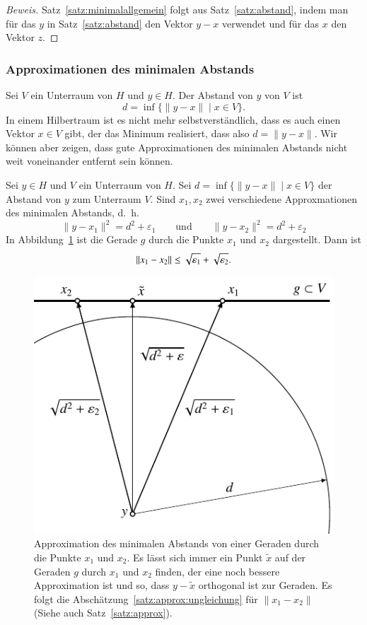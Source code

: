 \begin{proof}[Beweis]
Satz~\ref{satz:minimalallgemein} folgt aus Satz~\ref{satz:abstand}, indem
man für das $y$ in Satz~\ref{satz:abstand} den Vektor $y-x$ verwendet und
für das $x$ den Vektor $z$.
\end{proof}

\subsubsection{Approximationen des minimalen Abstands}
Sei $V$ ein Unterraum von $H$ und $y\in H$.
Der Abstand von $y$ von $V$ ist
\[
d = \inf \{ \| y - x\| \;|\; x \in V\}.
\]
In einem Hilbertraum ist es nicht mehr selbstverständlich, dass es auch
einen Vektor $x\in V$ gibt, der das Minimum realisiert, dass also
$ d = \|y-x\|$.
Wir können aber zeigen, dass gute Approximationen des minimalen Abstands
nicht weit voneinander entfernt sein können.

\begin{satz}
\label{satz:approx}
Sei $y\in H$ und $V$ ein Unterraum von $H$.
Sei $d=\inf \{ \|y-x\| \;|\;x\in V\}$ der Abstand von $y$ zum Unterraum $V$.
Sind $x_1,x_2$ zwei verschiedene Approxmationen des minimalen Abstands, d.~h.
\[
\| y-x_1\|^2 = d^2+\varepsilon_1
\qquad\text{und}\qquad
\| y-x_2\|^2 = d^2+\varepsilon_2
\]
In Abbildung~\ref{figure:approx} ist die Gerade $g$ durch die Punkte $x_1$
und $x_2$ dargestellt.
Dann ist 
\begin{equation}
\|x_1-x_2\| \le \sqrt{\mathstrut\varepsilon_1}+\sqrt{\mathstrut\varepsilon_2}.
\label{satz:approx:ungleichung}
\end{equation}
\end{satz}

\begin{figure}
\centering
\includegraphics{chapters/1-geometrie/images/approx.pdf}
\caption{Approximation des minimalen Abstands von einer Geraden durch
die Punkte $x_1$ und $x_2$.
Es lässt sich immer ein Punkt $\tilde{x}$ auf der Geraden $g$ durch
$x_1$ und $x_2$ finden, der eine noch bessere Approximation ist und so,
dass $y-\tilde{x}$ orthogonal ist zur Geraden.
Es folgt die Abschätzung~\eqref{satz:approx:ungleichung} für 
$\|x_1-x_2\|$ (Siehe auch Satz~\ref{satz:approx}).
\label{figure:approx}}
\end{figure}

